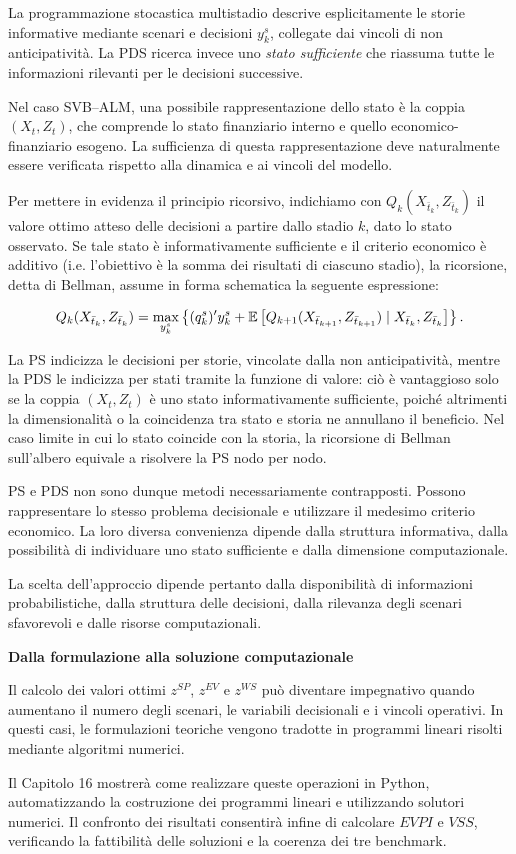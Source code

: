 La programmazione stocastica multistadio
descrive esplicitamente le storie informative
mediante scenari e decisioni $y_k^s$,
collegate dai vincoli di non anticipativit\`{a}.
La PDS ricerca invece uno \emph{stato sufficiente}
che riassuma tutte le informazioni rilevanti
per le decisioni successive.

Nel caso SVB--ALM, una possibile rappresentazione
dello stato \`{e} la coppia $(X_t,Z_t)$,
che comprende lo stato finanziario interno
e quello economico-finanziario esogeno.
La sufficienza di questa rappresentazione
deve naturalmente essere verificata
rispetto alla dinamica e ai vincoli del modello.

Per mettere in evidenza il principio ricorsivo,
indichiamo con $Q_k(X_{\bar t_k},Z_{\bar t_k})$
il valore ottimo atteso delle decisioni
a partire dallo stadio $k$, dato lo stato
osservato. Se tale stato \`{e} informativamente sufficiente
e il criterio economico \`{e} additivo (i.e. l'obiettivo \`e la somma dei risultati di ciascuno stadio),
la ricorsione, detta di Bellman, assume
in forma schematica la seguente espressione:

\[
Q_k(X_{\bar t_k},Z_{\bar t_k})
=
\max_{y_k^s}
\left\{
(q_k^s)'y_k^s
+
\mathbb{E}\left[
Q_{k+1}(X_{\bar t_{k+1}},Z_{\bar t_{k+1}})
\mid X_{\bar t_k},Z_{\bar t_k}
\right]
\right\}.
\]

La PS indicizza le decisioni per storie, vincolate dalla non
anticipativit\`{a}, mentre la PDS le indicizza per stati tramite
la funzione di valore: ci\`{o} \`{e} vantaggioso solo se la coppia $(X_t,Z_t)$ \`{e}
uno stato informativamente sufficiente, poich\'{e} altrimenti la
dimensionalit\`{a} o la coincidenza tra stato e storia ne annullano il beneficio. 
Nel caso limite in cui lo stato coincide con la storia, la ricorsione di Bellman sull'albero equivale a risolvere la PS nodo per nodo.

PS e PDS non sono dunque metodi
necessariamente contrapposti. Possono
rappresentare lo stesso problema decisionale
e utilizzare il medesimo criterio economico.
La loro diversa convenienza dipende
dalla struttura informativa, dalla possibilit\`{a}
di individuare uno stato sufficiente
e dalla dimensione computazionale.

La scelta dell'approccio dipende pertanto
dalla disponibilit\`{a} di informazioni
probabilistiche, dalla struttura delle
decisioni, dalla rilevanza degli scenari
sfavorevoli e dalle risorse computazionali.

\medskip
\noindent
\textbf{Dalla formulazione alla soluzione computazionale}

Il calcolo dei valori ottimi $z^{SP}$, $z^{EV}$ e $z^{WS}$
pu\`{o} diventare impegnativo quando aumentano
il numero degli scenari, le variabili decisionali
e i vincoli operativi. In questi casi, le formulazioni
teoriche vengono tradotte in programmi lineari
risolti mediante algoritmi numerici.

Il Capitolo 16 mostrer\`{a} come realizzare
queste operazioni in Python, automatizzando
la costruzione dei programmi lineari e
utilizzando solutori numerici. Il confronto
dei risultati consentir\`{a} infine di calcolare
$EVPI$ e $VSS$, verificando la fattibilit\`{a}
delle soluzioni e la coerenza dei tre benchmark.